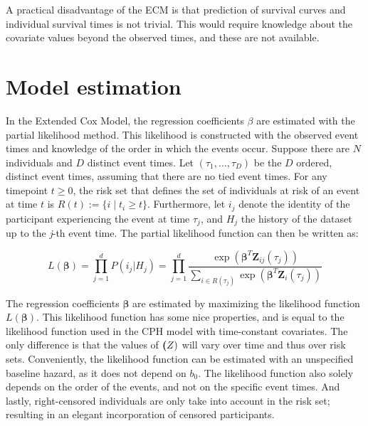 A practical disadvantage of the ECM is that prediction of survival curves and individual survival times is not trivial. This would require knowledge about the covariate values beyond the observed times, and these are not available. 


\section{Model estimation}
\label{section:data:model_estimation}
In the Extended Cox Model, the regression coefficients $\beta$ are estimated with the partial likelihood method. This likelihood is constructed with the observed event times and knowledge of the order in which the events occur. Suppose there are $N$ individuals and $D$ distinct event times. Let $(\tau_1, ..., \tau_D)$ be the $D$ ordered, distinct event times, assuming that there are no tied event times. For any timepoint $t \geq 0$, the risk set that defines the set of individuals at risk of an event at time $t$ is $R(t) := \{i \mid t_i \geq t\}$. Furthermore, let $i_j$ denote the identity of the participant experiencing the event at time $\tau_j$, and $H_j$ the history of the dataset up to the \textit{j}-th event time. The partial likelihood function can then be written as: 

$$L(\boldsymbol{\beta}) = \prod_{j=1}^{d}P(i_j | H_j) = \prod_{j=1}^{d} \frac{\exp(\boldsymbol{\beta}^T \mathbf{Z}_{ij}(\tau_j))}{\sum_{i \in R(\tau_j)} \exp(\boldsymbol{\beta}^T \mathbf{Z}_{i}(\tau_j))}$$

The regression coefficients $\boldsymbol{\beta}$ are estimated by maximizing the likelihood function $L(\boldsymbol{\beta})$. This likelihood function has some nice properties, and is equal to the likelihood function used in the CPH model with time-constant covariates. The only difference is that the values of $\textbf(Z)$ will vary over time and thus over risk sets. Conveniently, the likelihood function can be estimated with an unspecified baseline hazard, as it does not depend on $b_0$. The likelihood function also solely depends on the order of the events, and not on the specific event times. And lastly, right-censored individuals are only take into account in the risk set; resulting in an elegant incorporation of censored participants. 

